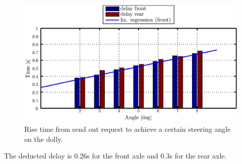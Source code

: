 \documentclass[ExampleMasters.tex]{subfiles}
\begin{document}
\begin{figure}[!hbt]
	\centering
	\includegraphics[width=1\linewidth]{figures/delay_testing_lin_interpolation}
	\caption{Rise time from send out request to achieve a certain steering angle on the dolly.}
	\label{fig:delay_testing_lin_interpolation}
\end{figure}
The deducted delay is 0.26s for the front axle and 0.3s for the rear axle.
\end{document}

